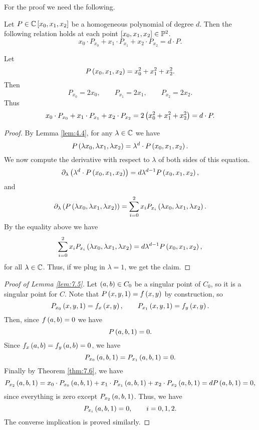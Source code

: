 For the proof we need the following.

\begin{theorem}
\label{thm:7.6}
Let $ P \in \C\sb{x_0, x_1, x_2} $ be a homogeneous polynomial of degree $ d $. Then the following relation holds at each point $ \sb{x_0, x_1, x_2} \in \P^2 $.
$$ x_0 \cdot P_{x_0} + x_1 \cdot P_{x_1} + x_2 \cdot P_{x_2} = d \cdot P. $$
\end{theorem}

\begin{example*}
Let
$$ P\rb{x_0, x_1, x_2} = x_0^2 + x_1^2 + x_2^2. $$
Then
$$ P_{x_0} = 2x_0, \qquad P_{x_1} = 2x_1, \qquad P_{x_2} = 2x_2. $$
Thus
$$ x_0 \cdot P_{x_0} + x_1 \cdot P_{x_1} + x_2 \cdot P_{x_2} = 2\rb{x_0^2 + x_1^2 + x_2^2} = d \cdot P. $$
\end{example*}

\begin{proof}
By Lemma \ref{lem:4.4}, for any $ \lambda \in \C $ we have
$$ P\rb{\lambda x_0, \lambda x_1, \lambda x_2} = \lambda^d \cdot P\rb{x_0, x_1, x_2}. $$
We now compute the derivative with respect to $ \lambda $ of both sides of this equation.
$$ \partial_\lambda\rb{\lambda^d \cdot P\rb{x_0, x_1, x_2}} = d\lambda^{d - 1}P\rb{x_0, x_1, x_2}, $$
and
$$ \partial_\lambda\rb{P\rb{\lambda x_0, \lambda x_1, \lambda x_2}} = \sum_{i = 0}^2 x_iP_{x_i}\rb{\lambda x_0, \lambda x_1, \lambda x_2}. $$
By the equality above we have
$$ \sum_{i = 0}^2 x_iP_{x_i}\rb{\lambda x_0, \lambda x_1, \lambda x_2} = d\lambda^{d - 1}P\rb{x_0, x_1, x_2}, $$
for all $ \lambda \in \C $. Thus, if we plug in $ \lambda = 1 $, we get the claim.
\end{proof}

\pagebreak

\begin{proof}[Proof of Lemma \ref{lem:7.5}]
Let $ \rb{a, b} \in C_0 $ be a singular point of $ C_0 $, so it is a singular point for $ C $. Note that $ P\rb{x, y, 1} = f\rb{x, y} $ by construction, so
$$ P_{x_0}\rb{x, y, 1} = f_x\rb{x, y}, \qquad P_{x_1}\rb{x, y, 1} = f_y\rb{x, y}. $$
Then, since $ f\rb{a, b} = 0 $ we have
$$ P\rb{a, b, 1} = 0. $$
Since $ f_x\rb{a, b} = f_y\rb{a, b} = 0 $, we have
$$ P_{x_0}\rb{a, b, 1} = P_{x_1}\rb{a, b, 1} = 0. $$
Finally by Theorem \ref{thm:7.6}, we have
$$ P_{x_2}\rb{a, b, 1} = x_0 \cdot P_{x_0}\rb{a, b, 1} + x_1 \cdot P_{x_1}\rb{a, b, 1} + x_2 \cdot P_{x_2}\rb{a, b, 1} = dP\rb{a, b, 1} = 0, $$
since everything is zero except $ P_{x_2}\rb{a, b, 1} $. Thus, we have
$$ P_{x_i}\rb{a, b, 1} = 0, \qquad i = 0, 1, 2. $$
The converse implication is proved similarly.
\end{proof}

